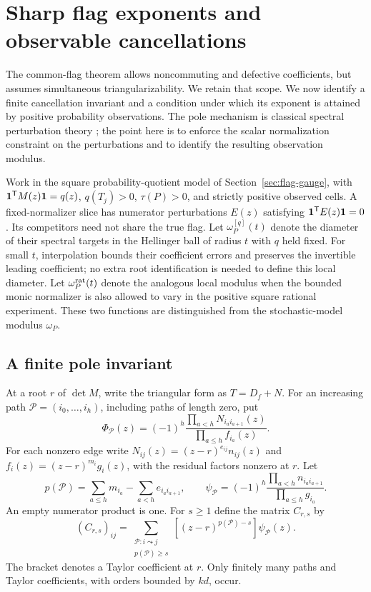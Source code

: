 \section{Sharp flag exponents and observable cancellations}
\label{sec:sharp-flag}
The common-flag theorem allows noncommuting and defective coefficients,
but assumes simultaneous triangularizability. We retain that scope.
We now identify a finite cancellation invariant and a condition under
which its exponent is attained by positive probability observations.
The pole mechanism is classical spectral perturbation theory
\cite{MBO97,KPM09,TH}; the point here is to enforce the scalar
normalization constraint on the perturbations and to identify the
resulting observation modulus.

Work in the square probability-quotient model of
Section~\ref{sec:flag-gauge}, with $\mathbf 1^{\mathsf T}M(z)\mathbf 1=q(z)$,
$q(T_j)>0$, $\tau(P)>0$, and strictly positive observed cells. A fixed-normalizer
slice has numerator perturbations $E(z)$ satisfying
$\mathbf 1^{\mathsf T}E(z)\mathbf 1=0$. Its competitors need not share the true
flag. Let $\omega^{[q]}_P(t)$ denote the diameter of their spectral
targets in the Hellinger ball of radius $t$ with $q$ held fixed.
For small $t$, interpolation bounds their coefficient errors and
preserves the invertible leading coefficient; no extra root
identification is needed to define this local diameter. Let
$\omega^{\rm rat}_P(t)$ denote the analogous local modulus when the
bounded monic normalizer is also allowed to vary in the positive
square rational experiment. These two functions are distinguished
from the stochastic-model modulus $\omega_P$.

\subsection{A finite pole invariant}
At a root $r$ of $\det M$, write the triangular form as
$T=D_f+N$. For an increasing path
$\mathcal P=(i_0,\ldots,i_h)$, including paths of length zero, put
\[
 \Phi_{\mathcal P}(z)=(-1)^h
        \frac{\prod_{a<h}N_{i_ai_{a+1}}(z)}
             {\prod_{a\le h}f_{i_a}(z)}.
\]
For each nonzero edge write $N_{ij}(z)=(z-r)^{e_{ij}}n_{ij}(z)$ and
$f_i(z)=(z-r)^{m_i}g_i(z)$, with the residual factors nonzero at $r$.
Let
\[
 p(\mathcal P)=\sum_{a\le h}m_{i_a}-\sum_{a<h}e_{i_ai_{a+1}},
 \qquad
 \psi_{\mathcal P}=(-1)^h
       \frac{\prod_{a<h}n_{i_ai_{a+1}}}{\prod_{a\le h}g_{i_a}}.
\]
An empty numerator product is one. For $s\ge1$ define the matrix
$C_{r,s}$ by
\begin{equation}\label{eq:path-laurent-test}
 (C_{r,s})_{ij}=
 \sum_{\substack{\mathcal P:i\leadsto j\\p(\mathcal P)\ge s}}
       [(z-r)^{p(\mathcal P)-s}]\psi_{\mathcal P}(z).
\end{equation}
The bracket denotes a Taylor coefficient at $r$. Only finitely many
paths and Taylor coefficients, with orders bounded by $kd$, occur.

